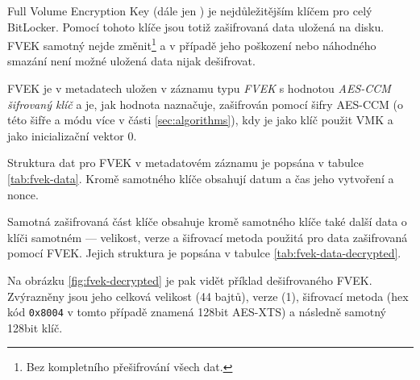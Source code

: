 
Full Volume Encryption Key (dále jen ) je nejdůležitějším klíčem pro celý BitLocker. Pomocí tohoto klíče jsou totiž zašifrovaná data uložená na disku. FVEK samotný nejde změnit\footnote{Bez kompletního přešifrování všech dat.} a v případě jeho poškození nebo náhodného smazání není možné uložená data nijak dešifrovat.

FVEK je v metadatech uložen v záznamu typu \emph{FVEK} s hodnotou \emph{AES-CCM šifrovaný klíč} a je, jak hodnota naznačuje, zašifrován pomocí šifry AES-CCM (o této šifře a módu více v části \ref{sec:algorithms}), kdy je jako klíč použit VMK a jako inicializační vektor 0.


Struktura dat pro FVEK v metadatovém záznamu je popsána v tabulce \ref{tab:fvek-data}. Kromě samotného klíče obsahují datum a čas jeho vytvoření a nonce.

Samotná zašifrovaná část klíče obsahuje kromě samotného klíče také další data o klíči samotném --- velikost, verze a šifrovací metoda použitá pro data zašifrovaná pomocí FVEK. Jejich struktura je popsána v tabulce \ref{tab:fvek-data-decrypted}.


Na obrázku \ref{fig:fvek-decrypted} je pak vidět příklad dešifrovaného FVEK. Zvýrazněny jsou jeho celková velikost (44 bajtů), verze (1), šifrovací metoda (hex kód \texttt{0x8004} v tomto případě znamená 128bit AES-XTS) a následně samotný 128bit klíč.

